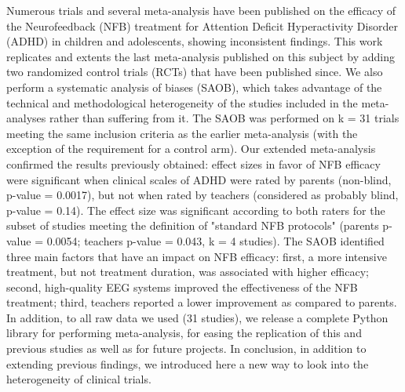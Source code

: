 

\noindent Numerous trials and several meta-analysis have been published on the efficacy of 
the Neurofeedback (NFB) treatment for Attention Deficit Hyperactivity Disorder (ADHD) in children 
and adolescents, showing inconsistent findings. This work replicates and extents the last meta-analysis 
published on this subject \citep{Cortese2016} by adding two randomized control trials (RCTs) that have been published since.
We also perform a systematic analysis of biases (SAOB), which takes advantage
of the technical and methodological heterogeneity of the studies included in the meta-analyses
rather than suffering from it.
The SAOB was performed on k = 31 trials meeting the same inclusion criteria as the earlier meta-analysis 
(with the exception of the requirement for a control arm). Our extended meta-analysis confirmed the results previously obtained: 
effect sizes in favor of NFB efficacy  were significant when clinical scales of ADHD were rated by parents (non-blind, p-value = 0.0017), 
but not when rated by teachers (considered as probably blind, p-value = 0.14). The effect size was significant according to both raters for 
the subset of studies meeting the definition of "standard NFB protocols" (parents p-value = 0.0054; teachers p-value = 0.043, 
k = 4 studies). The SAOB identified three main factors that have an impact on NFB efficacy: first, a more intensive treatment, but
not treatment duration, was associated with higher efficacy; second, high-quality EEG systems improved the effectiveness of the NFB 
treatment; third, teachers reported a lower improvement as compared to parents. In addition, to all raw data we used (31 studies), 
we release a complete Python library for performing meta-analysis, for easing the replication of this and previous studies as well 
as for future projects. In conclusion, in addition to extending previous findings, we introduced here a new way to look into the 
heterogeneity of clinical trials.


